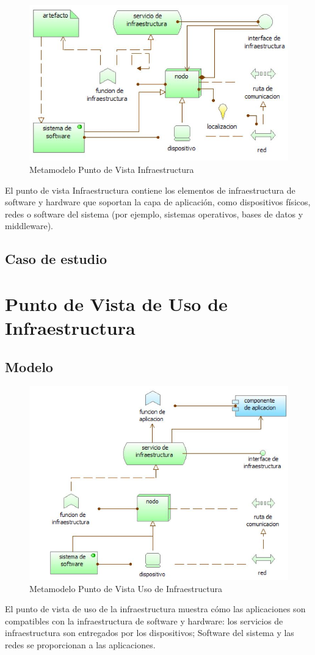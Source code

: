 \begin{figure}[th!]
	\centering
	\includegraphics[width=0.7\linewidth]{arquitectura/imagenes/modeloInfraestructura}
	\caption{Metamodelo Punto de Vista Infraestructura}
	\label{metamodeloInfraestructura}
\end{figure}
El punto de vista Infraestructura contiene los elementos de infraestructura de software y hardware que soportan la capa de aplicación, como dispositivos físicos, redes o software del sistema (por ejemplo, sistemas operativos, bases de datos y middleware).

\subsection{Caso de estudio}

\newpage

\section{Punto de Vista de Uso de Infraestructura}

\subsection{Modelo}

\begin{figure}[th!]
	\centering
	\includegraphics[width=0.7\linewidth]{arquitectura/imagenes/modeloUsoInfraestructura}
	\caption{Metamodelo Punto de Vista Uso de Infraestructura}
	\label{metamodeloUsoInfraestructura}
\end{figure}
El punto de vista de uso de la infraestructura muestra cómo las aplicaciones son compatibles con la infraestructura de software y hardware: los servicios de infraestructura son entregados por los dispositivos; Software del sistema y las redes se proporcionan a las aplicaciones. 

